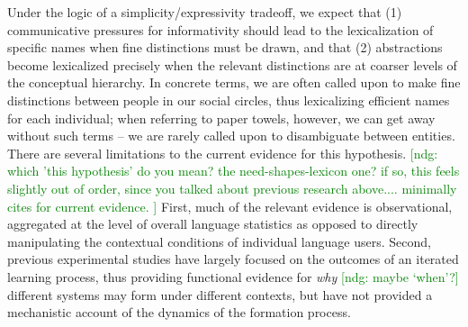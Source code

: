 \documentclass[10pt,letterpaper]{article}
\newcommand{\ndg}[1]{\textcolor{Green}{[ndg: #1]}}
\begin{document}
Under the logic of a simplicity/expressivity tradeoff, we expect that (1) communicative pressures for informativity should lead to the lexicalization of specific names when fine distinctions must be drawn, and that (2) abstractions become lexicalized precisely when the relevant distinctions are at coarser levels of the conceptual hierarchy. In concrete terms, we are often called upon to make fine distinctions between people in our social circles, thus lexicalizing efficient names for each individual; when referring to paper towels, however, we can get away without such terms -- we are rarely called upon to disambiguate between entities. %
There are several limitations to the current evidence for this hypothesis. \ndg{which 'this hypothesis' do you mean? the need-shapes-lexicon one? if so, this feels slightly out of order, since you talked about previous research above.... minimally cites for current evidence. }
First, much of the relevant evidence is observational, aggregated at the level of overall language statistics as opposed to directly manipulating the contextual conditions of individual language users. 
Second, previous experimental studies have largely focused on the outcomes of an iterated learning process, thus providing functional evidence for \emph{why} \ndg{maybe `when'?} different systems may form under different contexts, but have not provided a mechanistic account of the dynamics of the formation process.
\end{document}
